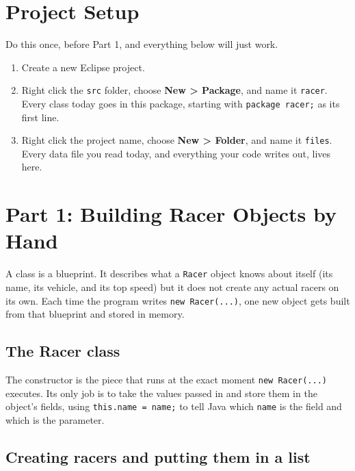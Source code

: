 \documentclass[11pt]{article}
\begin{document}
\section{Project Setup}

Do this once, before Part 1, and everything below will just work.

\begin{enumerate}[itemsep=2pt]
  \item Create a new Eclipse project.
  \item Right click the \texttt{src} folder, choose
    \textbf{New > Package}, and name it \texttt{racer}. Every class
    today goes in this package, starting with \texttt{package racer;}
    as its first line.
  \item Right click the project name, choose \textbf{New > Folder},
    and name it \texttt{files}. Every data file you read today, and
    everything your code writes out, lives here.
\end{enumerate}

\section{Part 1: Building Racer Objects by Hand}

A class is a blueprint. It describes what a \texttt{Racer} object
knows about itself (its name, its vehicle, and its top speed) but it
does not create any actual racers on its own. Each time the program
writes \texttt{new Racer(...)}, one new object gets built from that
blueprint and stored in memory.

\subsection{The Racer class}



The constructor is the piece that runs at the exact moment
\texttt{new Racer(...)} executes. Its only job is to take the values
passed in and store them in the object's fields, using
\texttt{this.name = name;} to tell Java which \texttt{name} is the
field and which is the parameter.

\subsection{Creating racers and putting them in a list}


\end{document}
